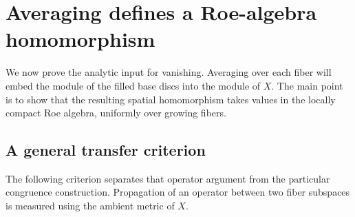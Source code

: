\section{Averaging defines a Roe-algebra homomorphism}\label{sec:transfer}

We now prove the analytic input for vanishing. Averaging over each fiber
will embed the module of the filled base discs into the module of $X$.
The main point is to show that the resulting spatial homomorphism takes
values in the locally compact Roe algebra, uniformly over growing fibers.

\subsection{A general transfer criterion}
The following criterion separates that operator argument from the particular
congruence construction. Propagation of an operator between two fiber
subspaces is measured using the ambient metric of $X$.

